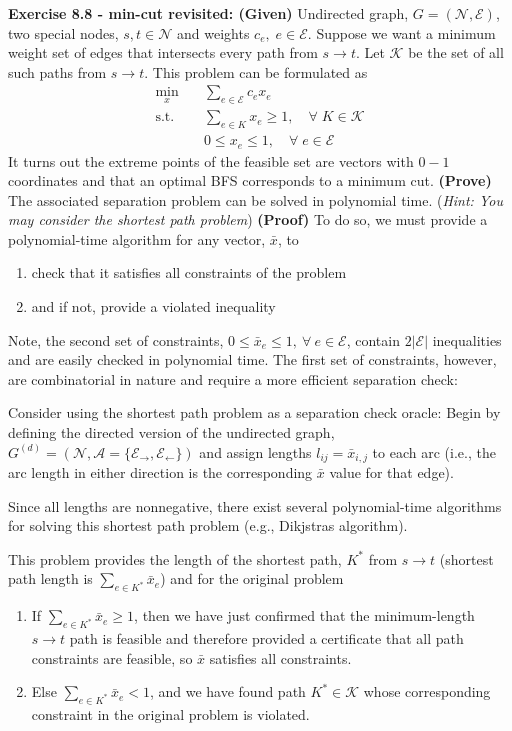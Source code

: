 \documentclass[11pt]{exam}
\begin{document}
\begin{questions}
    
    \question \textbf{Exercise 8.8 - min-cut revisited: (Given)} Undirected graph, $G=(\mathcal N, \mathcal E)$, two special nodes, $s,t\in \mathcal N$ and weights $c_e,\; e\in\mathcal E$. Suppose we want a minimum weight set of edges that intersects every path from $s\rightarrow t$. Let $\mathcal K$ be the set of all such paths from $s\rightarrow t$. This problem can be formulated as
    \begin{align*}
        \min_x\quad& \sum_{e\in\mathcal E}c_ex_e\\
        \text{s.t.}\quad& \sum_{e\in K}x_e \geq 1,\quad \forall\;K\in\mathcal K\\
        & 0\leq x_e\leq 1,\quad \forall\;e\in\mathcal E
    \end{align*}
    It turns out the extreme points of the feasible set are vectors with $0-1$ coordinates and that an optimal BFS corresponds to a minimum cut. \textbf{(Prove)} The associated separation problem can be solved in polynomial time. (\textit{Hint: You may consider the shortest path problem})
    \newline \textbf{(Proof)} To do so, we must provide a polynomial-time algorithm for any vector, $\bar x$, to
    \begin{enumerate}
        \item check that it satisfies all constraints of the problem
        \item and if not, provide a violated inequality 
    \end{enumerate}
    Note, the second set of constraints, $0\leq \bar x_e\leq 1,\ \forall\ e\in\mathcal E$, contain $2|\mathcal E|$ inequalities and are easily checked in polynomial time. The first set of constraints, however, are combinatorial in nature and require a more efficient separation check:
    
    Consider using the shortest path problem as a separation check oracle: Begin by defining the directed version of the undirected graph, $G^{(d)} = (\mathcal N, \mathcal A=\{\mathcal E_\rightarrow, \mathcal E_\leftarrow\})$ and assign lengths $l_{ij} = \bar x_{i,j}$ to each arc (i.e., the arc length in either direction is the corresponding $\bar x$ value for that edge).
    
    Since all lengths are nonnegative, there exist several polynomial-time algorithms for solving this shortest path problem (e.g., Dikjstras algorithm).

    This problem provides the length of the shortest path, $K^*$ from $s\rightarrow t$ (shortest path length is $\sum_{e\in K^*} \bar x_e$) and for the original problem
    \begin{enumerate}
        \item If $\sum_{e\in K^*} \bar x_e \geq 1$, then we have just confirmed that the minimum-length $s\rightarrow t$ path is feasible and therefore provided a certificate that all path constraints are feasible, so $\bar x$ satisfies all constraints.
        \item Else $\sum_{e\in K^*} \bar x_e < 1$, and we have found path $K^* \in \mathcal K$ whose corresponding constraint in the original problem is violated.
    \end{enumerate}




\end{questions}
\end{document}
